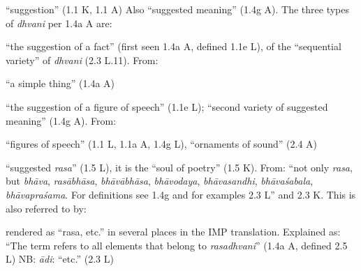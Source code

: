 \documentclass[10pt]{article}
\begin{document}
\begin{multicols}{2}
	\begin{enumerate}[
			leftmargin=0em,
			rightmargin=0em,
		]
		\setlength{\itemsep}{0.15em}
		\setcounter{enumi}{7}%

		 ``suggestion'' (1.1 K, 1.1 A) Also ``suggested meaning'' (1.4g A).
		The three types of \textit{dhvani} per 1.4a A are:
		\begin{enumerate}

			 ``the suggestion of a fact'' (first seen 1.4a A, defined 1.1e L),
			of the ``sequential variety'' of \textit{dhvani} (2.3 L.11).
			From:
			\begin{itemize}
				 ``a simple thing'' (1.4a A)
			\end{itemize}

			 ``the suggestion of a figure of speech'' (1.1e L);
			``second variety of suggested meaning'' (1.4g A).
			From:
			\begin{itemize}
				 ``figures of speech'' (1.1 L, 1.1a A, 1.4g L), ``ornaments of sound'' (2.4 A)
			\end{itemize}

			 ``suggested \textit{rasa}'' (1.5 L),
			it is the ``soul of poetry'' (1.5 K).
			From: ``not only \textit{rasa},
			but \textit{bhāva}, %
			\textit{rasābhāsa}, %
			\textit{bhāvābhāsa}, %
			\textit{bhāvodaya}, %
			\textit{bhāvasandhi}, %
			\textit{bhāvaśabala}, %
			\textit{bhāvapraśama}. %
			For definitions see 1.4g and for examples 2.3 L''
			and 2.3 K. %
			This is also referred to by:
			\begin{itemize}
				 rendered as ``rasa, etc.'' in several places in the IMP translation.
				Explained as: ``The term refers to all elements that belong to \textit{rasadhvani}'' (1.4a A, defined 2.5 L) NB: \textit{ādi}: ``etc.'' (2.3 L)


\end{itemize}
\end{enumerate}
\end{enumerate}
\end{multicols}
\end{document}
